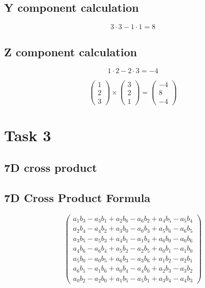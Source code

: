 \documentclass{article}
\begin{document}
\subsection*{ \vspace{1em} Y component calculation}
\[
3 \cdot 3 - 1 \cdot 1 = 8
\]
\subsection*{ \vspace{1em} Z component calculation}
\[
1 \cdot 2 - 2 \cdot 3 = -4
\]
\medskip

\[
\begin{pmatrix}1 \\ 2 \\ 3\end{pmatrix} \times \begin{pmatrix}3 \\ 2 \\ 1\end{pmatrix} = \begin{pmatrix}-4 \\ 8 \\ -4\end{pmatrix}
\]
\bigskip

\hrulefill
\bigskip

\section*{Task 3}

\subsection*{7D cross product}
\subsection*{ \vspace{1em} 7D Cross Product Formula}
\[
\begin{pmatrix}
        a_1b_3 - a_3b_1 + a_2b_6 - a_6b_2 + a_4b_5 - a_5b_4 \\
        a_2b_4 - a_4b_2 + a_3b_0 - a_0b_3 + a_5b_6 - a_6b_5 \\
        a_3b_5 - a_5b_3 + a_4b_1 - a_1b_4 + a_6b_0 - a_0b_6 \\
        a_4b_6 - a_6b_4 + a_5b_2 - a_2b_5 + a_0b_1 - a_1b_0 \\
        a_5b_0 - a_0b_5 + a_6b_3 - a_3b_6 + a_1b_2 - a_2b_1 \\
        a_6b_1 - a_1b_6 + a_0b_4 - a_4b_0 + a_2b_3 - a_3b_2 \\
        a_0b_2 - a_2b_0 + a_1b_5 - a_5b_1 + a_3b_4 - a_4b_3
        \end{pmatrix}
\]
\end{document}
